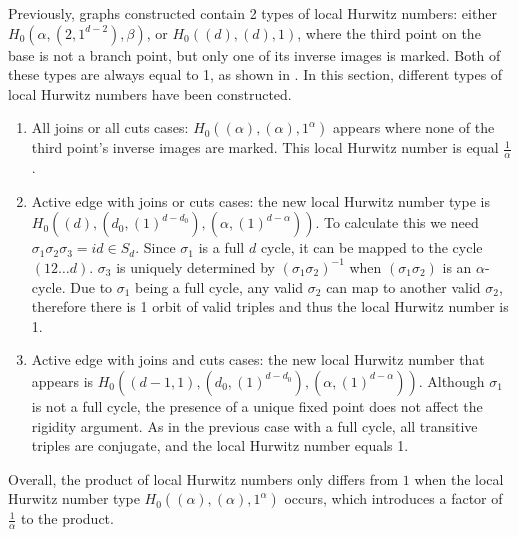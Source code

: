\documentclass[11pt,reqno]{amsart}
\theoremstyle{definition}
\begin{document}
Previously, graphs constructed contain 2 types of local Hurwitz numbers: either \\$H_0(\alpha, (2,1^{d-2}), \beta)$, or $H_0((d),(d), 1)$, where the third point on the base is not a branch point, but only one of its inverse images is marked. Both of these types are always equal to 1, as shown in \cite{troptev}. In this section, different types of local Hurwitz numbers have been constructed. 
\begin{enumerate}
    \item All joins or all cuts cases: $H_0((\alpha),(\alpha), 1^\alpha)$ appears where none of the third point's inverse images are marked. This local Hurwitz number is equal $\frac{1}{\alpha}$.
    \item Active edge with joins or cuts cases: the new local Hurwitz number type is \\ $H_0((d),(d_0,(1)^{d-d_0}),(\alpha,(1)^{d-\alpha}))$. To calculate this we need $\sigma_1\sigma_2\sigma_3=id \in S_d$. Since $\sigma_1$ is a full $d$ cycle, it can be mapped to the cycle $(12\dots d)$. $\sigma_3$ is uniquely determined by $(\sigma_1\sigma_2)^{-1}$ when $(\sigma_1\sigma_2)$ is an $\alpha$-cycle. Due to $\sigma_1$ being a full cycle, any valid $\sigma_2$ can map to another valid $\sigma_2$, therefore there is 1 orbit of valid triples and thus the local Hurwitz number is 1.
    \item Active edge with joins and cuts cases: the new local Hurwitz number that appears is $H_0((d-1,1),(d_0,(1)^{d-d_0}),(\alpha,(1)^{d-\alpha}))$. Although $\sigma_1$ is not a full cycle, the presence of a unique fixed point does not affect the rigidity argument. As in the previous case with a full cycle, all transitive triples are conjugate, and the local Hurwitz number equals 1.
\end{enumerate}   
Overall, the product of local Hurwitz numbers only differs from $1$ when the local Hurwitz number type $H_0((\alpha),(\alpha), 1^\alpha)$ occurs, which introduces a factor of $\frac{1}{\alpha}$ to the product. 
\end{document}
